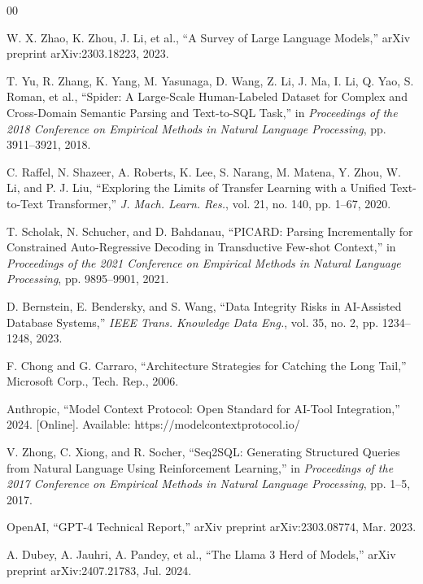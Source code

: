 \documentclass[conference]{IEEEtran}
\begin{document}
\begin{thebibliography}{00}

 W. X. Zhao, K. Zhou, J. Li, et al., ``A Survey of Large Language Models,'' arXiv preprint arXiv:2303.18223, 2023.

 T. Yu, R. Zhang, K. Yang, M. Yasunaga, D. Wang, Z. Li, J. Ma, I. Li, Q. Yao, S. Roman, et al., ``Spider: A Large-Scale Human-Labeled Dataset for Complex and Cross-Domain Semantic Parsing and Text-to-SQL Task,'' in \textit{Proceedings of the 2018 Conference on Empirical Methods in Natural Language Processing}, pp. 3911--3921, 2018.

 C. Raffel, N. Shazeer, A. Roberts, K. Lee, S. Narang, M. Matena, Y. Zhou, W. Li, and P. J. Liu, ``Exploring the Limits of Transfer Learning with a Unified Text-to-Text Transformer,'' \textit{J. Mach. Learn. Res.}, vol. 21, no. 140, pp. 1--67, 2020.

 T. Scholak, N. Schucher, and D. Bahdanau, ``PICARD: Parsing Incrementally for Constrained Auto-Regressive Decoding in Transductive Few-shot Context,'' in \textit{Proceedings of the 2021 Conference on Empirical Methods in Natural Language Processing}, pp. 9895--9901, 2021.

 D. Bernstein, E. Bendersky, and S. Wang, ``Data Integrity Risks in AI-Assisted Database Systems,'' \textit{IEEE Trans. Knowledge Data Eng.}, vol. 35, no. 2, pp. 1234--1248, 2023.

 F. Chong and G. Carraro, ``Architecture Strategies for Catching the Long Tail,'' Microsoft Corp., Tech. Rep., 2006.

 Anthropic, ``Model Context Protocol: Open Standard for AI-Tool Integration,'' 2024. [Online]. Available: https://modelcontextprotocol.io/

 V. Zhong, C. Xiong, and R. Socher, ``Seq2SQL: Generating Structured Queries from Natural Language Using Reinforcement Learning,'' in \textit{Proceedings of the 2017 Conference on Empirical Methods in Natural Language Processing}, pp. 1--5, 2017.

 OpenAI, ``GPT-4 Technical Report,'' arXiv preprint arXiv:2303.08774, Mar. 2023.

 A. Dubey, A. Jauhri, A. Pandey, et al., ``The Llama 3 Herd of Models,'' arXiv preprint arXiv:2407.21783, Jul. 2024.


\end{thebibliography}
\end{document}
